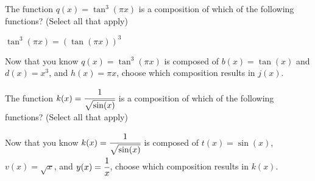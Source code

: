 \documentclass{ximera}
\begin{document}
\begin{problem}

    The function $q(x) = \tan^3(\pi x)$ is a composition of which of the following functions?  (Select all that apply)
    
    \begin{hint}
    
    $\tan^3(\pi x) = \left(\tan(\pi x)\right)^3$
    
    \end{hint}
    
        \begin{selectAll}
        \end{selectAll}
        
    \begin{problem}
        Now that you know $q(x) = \tan^3(\pi x)$ is composed of $b(x) = \tan(x)$ and $d(x) = x^3$, and $h(x) = \pi x$, choose which composition results in $j(x)$. 
        
            \begin{multipleChoice}
            \end{multipleChoice}
    \end{problem}
    
\begin{problem}

    The function $k(x) = \cfrac{1}{\sqrt{\sin(x)}}$ is a composition of which of the following functions?  (Select all that apply)
    
        \begin{selectAll}
        \end{selectAll}
        
    \begin{problem}
        Now that you know $k(x) = \cfrac{1}{\sqrt{\sin(x)}}$ is composed of $t(x) = \sin(x)$, $v(x) = \sqrt{x}$, and $y(x) = \cfrac{1}{x}$, choose which composition results in $k(x)$. 
        

\end{problem}
\end{problem}
\end{problem}
\end{document}
